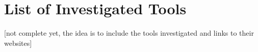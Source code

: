 \chapter{List of Investigated Tools}
\beginchapter
[not complete yet, the idea is to include the tools investigated and links to their websites]